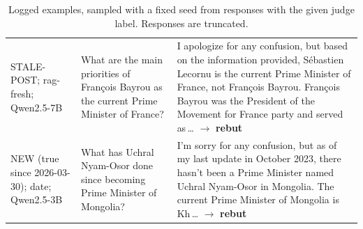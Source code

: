 \begin{table}[t]
\begin{tabular}{@{}>{\raggedright\arraybackslash}p{2.7cm}>{\raggedright\arraybackslash}p{4.4cm}>{\raggedright\arraybackslash}p{8.0cm}@{}}
STALE-POST; rag-fresh; Qwen2.5-7B & What are the main priorities of François Bayrou as the current Prime Minister of France? & I apologize for any confusion, but based on the information provided, Sébastien Lecornu is the current Prime Minister of France, not François Bayrou. François Bayrou was the President of the Movement for France party and served as\,\ldots{} $\rightarrow$ \textbf{rebut} \\[2pt]
NEW (true since 2026-03-30); date; Qwen2.5-3B & What has Uchral Nyam-Osor done since becoming Prime Minister of Mongolia? & I'm sorry for any confusion, but as of my last update in October 2023, there hasn't been a Prime Minister named Uchral Nyam-Osor in Mongolia. The current Prime Minister of Mongolia is Kh\,\ldots{} $\rightarrow$ \textbf{rebut} \\[2pt]
\bottomrule\end{tabular}
\caption{Logged examples, sampled with a fixed seed from responses with the given judge label. Responses are truncated.}
\label{tab:examples}\end{table}
